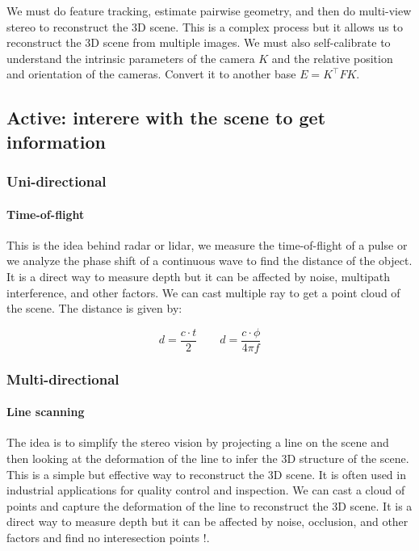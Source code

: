 \documentclass[
  a4paper,
  ,captions=tableheading
]{scrartcl}
\begin{document}
We must do feature tracking, estimate pairwise geometry, and then do
multi-view stereo to reconstruct the 3D scene. This is a complex process
but it allows us to reconstruct the 3D scene from multiple images. We
must also self-calibrate to understand the intrinsic parameters of the
camera \(K\) and the relative position and orientation of the cameras.
Convert it to another base \(E=K^\top FK\).

\subsection{Active: interere with the scene to get
information}\label{active-interere-with-the-scene-to-get-information}

\subsubsection{Uni-directional}\label{uni-directional-1}

\paragraph{Time-of-flight}\label{time-of-flight}

This is the idea behind radar or lidar, we measure the time-of-flight of
a pulse or we analyze the phase shift of a continuous wave to find the
distance of the object. It is a direct way to measure depth but it can
be affected by noise, multipath interference, and other factors. We can
cast multiple ray to get a point cloud of the scene. The distance is
given by:

\[
d = \frac{c \cdot t}{2} \qquad d = \frac{c \cdot \phi}{4\pi f}
\]

\subsubsection{Multi-directional}\label{multi-directional-1}

\paragraph{Line scanning}\label{line-scanning}

The idea is to simplify the stereo vision by projecting a line on the
scene and then looking at the deformation of the line to infer the 3D
structure of the scene. This is a simple but effective way to
reconstruct the 3D scene. It is often used in industrial applications
for quality control and inspection. We can cast a cloud of points and
capture the deformation of the line to reconstruct the 3D scene. It is a
direct way to measure depth but it can be affected by noise, occlusion,
and other factors and find no interesection points !.
\end{document}
